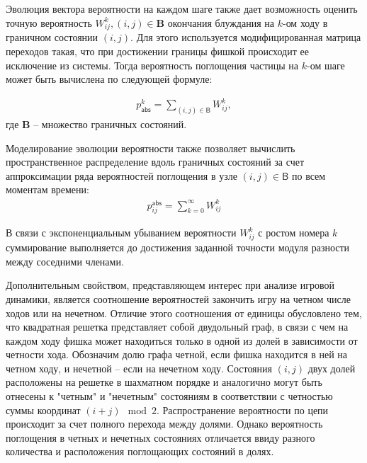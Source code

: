 Эволюция вектора вероятности на каждом шаге также дает возможность оценить точную вероятность $W_{ij}^{k}, (i, j) \in \boldsymbol{B}$ окончания блуждания на $k$-ом ходу в граничном состоянии $(i, j)$. Для этого используется модифицированная матрица переходов такая, что при достижении границы фишкой происходит ее исключение из системы. Тогда вероятность поглощения частицы на $k$-ом шаге может быть вычислена по следующей формуле:

\begin{equation}
    \begin{aligned}
    p_\mathsf{abs}^{k}=\sum_{(i, j) \in \boldsymbol{\mathsf{B}}} W_{ij}^{k},
    \label{eq:timedistr}
    \end{aligned}
\end{equation}
где $\textbf{B}$ -- множество граничных состояний.

Моделирование эволюции вероятности также позволяет вычислить пространственное распределение вдоль граничных состояний за счет аппроксимации ряда вероятностей поглощения в узле $(i, j) \in \boldsymbol{\mathsf{B}}$ по всем моментам времени:
\begin{equation}
    \begin{aligned}
    p_{ij}^\mathsf{abs}=\sum_{k=0}^{\infty} W_{ij}^{k}
    \label{eq:spacedistr}
    \end{aligned}
\end{equation}

В связи с экспоненциальным убыванием вероятности $W_{ij}^{k}$ с ростом номера $k$ суммирование выполняется до достижения заданной точности модуля разности между соседними членами.

Дополнительным свойством, представляющем интерес при анализе игровой динамики, является соотношение вероятностей закончить игру на четном числе ходов или на нечетном. Отличие этого соотношения от единицы обусловлено тем, что квадратная решетка представляет собой двудольный граф, в связи с чем на каждом ходу фишка может находиться только в одной из долей в зависимости от четности хода. Обозначим долю графа четной, если фишка находится в ней на четном ходу, и нечетной -- если на нечетном ходу. Состояния $(i, j)$ двух долей расположены на решетке в шахматном порядке и аналогично могут быть отнесены к "четным" и "нечетным" состояниям в соответствии с четностью суммы координат $(i + j) \mod 2$. Распространение вероятности по цепи происходит за счет полного перехода между долями. Однако вероятность поглощения в четных и нечетных состояниях отличается ввиду разного количества и расположения поглощающих состояний в долях.

